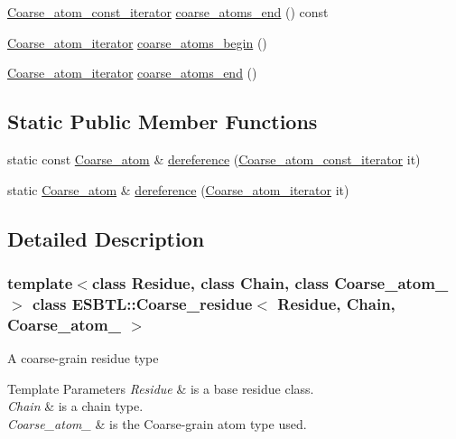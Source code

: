 \begin{DoxyCompactItemize}
\item 
\hyperlink{group__grp__iters_ga5a4a865846cdde342538df7fc03c80ce}{Coarse\+\_\+atom\+\_\+const\+\_\+iterator} \hyperlink{group__grp__iters_ga50026c05f269eddb69d9d775df51e442}{coarse\+\_\+atoms\+\_\+end} () const
\item 
\hyperlink{group__grp__iters_ga09a38741d50d3b7296dae83eb0911e49}{Coarse\+\_\+atom\+\_\+iterator} \hyperlink{group__grp__iters_gab001b6ad15d74ee2879ccc4669e52962}{coarse\+\_\+atoms\+\_\+begin} ()
\item 
\hyperlink{group__grp__iters_ga09a38741d50d3b7296dae83eb0911e49}{Coarse\+\_\+atom\+\_\+iterator} \hyperlink{group__grp__iters_ga2594d683372e0e198f725d8bd1577adf}{coarse\+\_\+atoms\+\_\+end} ()
\end{DoxyCompactItemize}
\subsection*{Static Public Member Functions}
\begin{DoxyCompactItemize}
\item 
static const \hyperlink{classESBTL_1_1Coarse__residue_a4e83dc008345f6b828bcd3a67045a051}{Coarse\+\_\+atom} \& \hyperlink{classESBTL_1_1Coarse__residue_a85c3825ca10ace200a4f2d4d626a81b0}{dereference} (\hyperlink{group__grp__iters_ga5a4a865846cdde342538df7fc03c80ce}{Coarse\+\_\+atom\+\_\+const\+\_\+iterator} it)
\item 
static \hyperlink{classESBTL_1_1Coarse__residue_a4e83dc008345f6b828bcd3a67045a051}{Coarse\+\_\+atom} \& \hyperlink{classESBTL_1_1Coarse__residue_aa3fa145ffbe14ab960c2baa41b6a0761}{dereference} (\hyperlink{group__grp__iters_ga09a38741d50d3b7296dae83eb0911e49}{Coarse\+\_\+atom\+\_\+iterator} it)
\end{DoxyCompactItemize}


\subsection{Detailed Description}
\subsubsection*{template$<$class Residue, class Chain, class Coarse\+\_\+atom\+\_\+$>$\newline
class E\+S\+B\+T\+L\+::\+Coarse\+\_\+residue$<$ Residue, Chain, Coarse\+\_\+atom\+\_\+ $>$}

A coarse-\/grain residue type 
\begin{DoxyTemplParams}{Template Parameters}
{\em Residue} & is a base residue class. \\
\hline
{\em Chain} & is a chain type. \\
\hline
{\em Coarse\+\_\+atom\+\_\+} & is the Coarse-\/grain atom type used. \\
\hline
\end{DoxyTemplParams}


